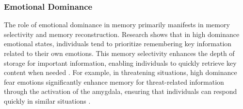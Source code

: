 
\subsubsection{Emotional Dominance}
The role of emotional dominance in memory primarily manifests in memory selectivity and memory reconstruction. Research shows that in high dominance emotional states, individuals tend to prioritize remembering key information related to their own emotions. This memory selectivity enhances the depth of storage for important information, enabling individuals to quickly retrieve key content when needed \cite{ledoux2000emotion}. For example, in threatening situations, high dominance fear emotions significantly enhance memory for threat-related information through the activation of the amygdala, ensuring that individuals can respond quickly in similar situations \cite{anderson2001lesions}.


